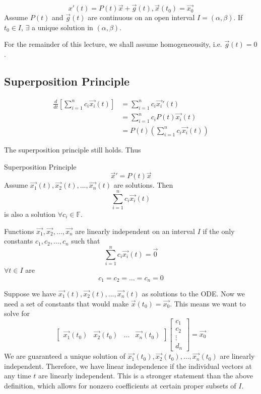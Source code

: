 \documentclass[12pt]{article}
\begin{document}
\begin{thm}
	$$x'(t) = P(t)\vec{x} + \vec{g}(t), \vec{x}(t_0) = \vec{x_0}$$
	Assume $P(t)$ and $\vec{g}(t)$ are continuous on an open interval $I = (\alpha, \beta)$. If $t_0 \in I$, $\exists$ a unique solution in $(\alpha, \beta)$.
\end{thm}

For the remainder of this lecture, we shall assume homogeneousity, i.e. $\vec{g}(t) = 0$.

\subsection{Superposition Principle}

\begin{align*}
	\frac{d}{dt} \left[\sum_{i=1}^n c_i\vec{x_i}(t)\right] &= \sum_{i=1}^n c_i \vec{x_i}'(t) \\
							       &= \sum_{i=1}^n c_iP(t)\vec{x_i}(t) \\
							       &= P(t)\left(\sum_{i=1}^nc_i\vec{x_i}(t)\right)
\end{align*}

The superposition principle still holds. Thus

\begin{thm}
	Superposition Principle \\
	$$\vec{x}' = P(t)\vec{x}$$
	Assume $\vec{x_1}(t), \vec{x_2}(t), \dots, \vec{x_n}(t)$ are solutions. Then
	$$\sum_{i=1}^nc_i\vec{x_i}(t)$$
	is also a solution $\forall c_i \in \mathbb{F}$.
\end{thm}

\begin{defn}
	Functions $\vec{x_1}, \vec{x_2}, \dots, \vec{x_n}$ are linearly independent on an interval $I$ if the only constants $c_1, c_2, \dots, c_n$ such that
	$$\sum_{i=1}^n c_i\vec{x_i}(t) = \vec{0}$$
	$\forall t \in I$ are
	$$c_1 = c_2 = \dots = c_n = 0$$
\end{defn}

Suppose we have $\vec{x_1}(t), \vec{x_2}(t), \dots, \vec{x_n}(t)$ as solutions to the ODE. Now we need a set of constants that would make $\vec{x}(t_0) = \vec{x_0}$. This means we want to solve for
$$\begin{bmatrix} \vec{x_1}(t_0) & \vec{x_2}(t_0) & \dots & \vec{x_n}(t_0) \end{bmatrix} \begin{bmatrix} c_1 \\ c_2 \\ \vdots \\ d_n \end{bmatrix} = \vec{x_0}$$
We are guaranteed a unique solution of $\vec{x_1}(t_0), \vec{x_2}(t_0), \dots, \vec{x_n}(t_0)$ are linearly independent. Therefore, we have linear independence if the individual vectors at any time $t$ are linearly independent. This is a stronger statement than the above definition, which allows for nonzero coefficients at certain proper subsets of $I$.
\end{document}
